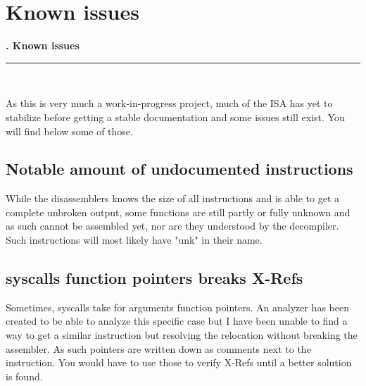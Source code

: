 \documentclass[openany,oneside]{memoir}
\newcommand{\Line}{\rule{\linewidth}{1.0mm}}
\newcommand{\Chapter}[1]{
\pagestyle{fancy}
\chapter{#1}
\begin{vplace}[0.7]
{\Huge   \null\hfill{\textbf{\thechapter.  #1}}} \\
\Line \\
\end{vplace} 
\newpage
}
\begin{document}
\Chapter{Known issues}
As this is very much a work-in-progress project, much of the ISA has yet to
stabilize before getting a stable documentation and some issues still exist. You
will find below some of those.

\section{Notable amount of undocumented instructions}
While the disassemblers knows the size of all instructions and is able to get a
complete unbroken output, some functions are still partly or fully unknown and
as such cannot be assembled yet, nor are they understood by the decompiler. Such
instructions will most likely have "unk" in their name.

\section{syscalls function pointers breaks X-Refs}
Sometimes, syscalls take for arguments function pointers. An analyzer has been
created to be able to analyze this specific case but I have been unable to find
a way to get a similar instruction but resolving the relocation without breaking
the assembler.
As such pointers are written down as comments next to the instruction. You would
have to use those to verify X-Refs until a better solution is found.
\end{document}
